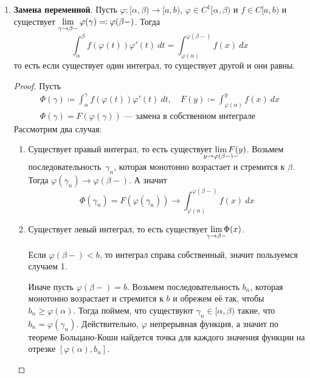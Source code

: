 \begin{enumerate}
    \item \textbf{Замена переменной}. Пусть $\varphi\colon [\alpha, \beta) \to [a, b),\, \varphi \in C^{1}[\alpha, \beta)$ и $f \in C[a, b)$ и существует $\lim\limits_{\gamma \to \beta-}
  \varphi(\gamma) \leftcoleqq \varphi(\beta-)$. Тогда
    \begin{equation*}
      \int_{\alpha}^{\beta} f(\varphi(t))\varphi'(t) \: dt =
      \int_{\varphi(\alpha)}^{\varphi(\beta-)} f(x) \: dx
    \end{equation*}
  то есть если существует один интеграл, то существует другой и они равны.
  \begin{proof}
    Пусть
    \begin{equation*}
      \begin{gathered}
        \Phi(\gamma) \coloneqq
        \int_{\alpha}^{\gamma} f(\varphi(t))\varphi'(t) \: dt, \quad
        F(y) \coloneqq \int_{\varphi(\alpha)}^{y} f(x) \: dx \\
        \Phi(\gamma) = F(\varphi(\gamma))\text{ --- замена в собственном интеграле}
      \end{gathered}
    \end{equation*}
    Рассмотрим два случая:
    \begin{enumerate}[1)]
      \item Существует правый интеграл, то есть существует $\lim\limits_{\mathclap{y \to \varphi(\beta-)-}} F(y)$. Возьмем последовательность~$\gamma_n$, которая монотонно возрастает и стремится к $\beta$. Тогда $\varphi(\gamma_n) \to \varphi(\beta-)$.
  А значит
  \begin{equation*}
    \Phi(\gamma_n) = F(\varphi(\gamma_n)) \to \int_{\varphi(\alpha)}^{\varphi(\beta -)} f(x) \: dx
  \end{equation*}
      \item Существует левый интеграл, то есть существует $\lim\limits_{\mathclap{\gamma \to \beta-}}\Phi(x)$.

      Если $\varphi(\beta -) < b$, то интеграл справа собственный, значит пользуемся случаем 1.

      Иначе пусть $\varphi(\beta -) = b$. Возьмем последовательность $b_n$, которая монотонно возрастает и стремится к $b$ и обрежем её так, чтобы $b_n \geq \varphi(\alpha)$. Тогда поймем, что существуют $\gamma_n \in [\alpha, \beta)$ такие, что $b_n = \varphi(\gamma_n)$. Действительно, $\varphi$ непрерывная функция, а значит по теореме Больцано-Коши найдется точка для каждого значения функции на отрезке $[\varphi(\alpha), b_n]$.


\end{enumerate}
\end{proof}
\end{enumerate}
